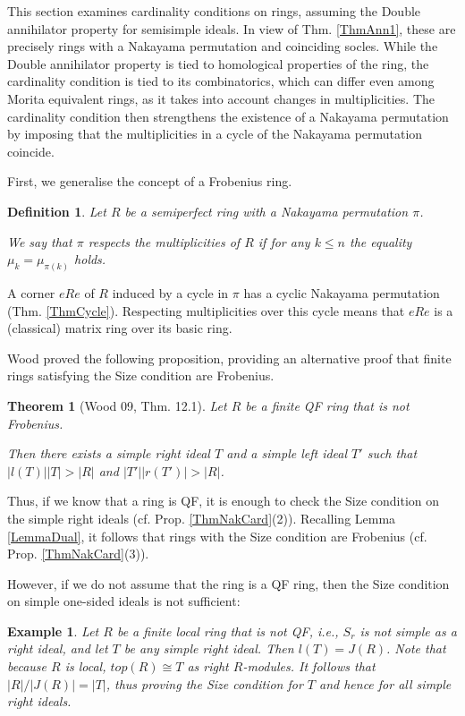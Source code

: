 \documentclass[11pt]{article}
\theoremstyle{plain}
\newtheorem{Thm}[veta]{Theorem}
\newtheorem{Ex}[veta]{Example}
\newtheorem{Def}[veta]{Definition}
\theoremstyle{remark}
\theoremstyle{plain}
\begin{document}
This section examines cardinality conditions on rings, assuming the Double annihilator property for semisimple ideals. In view of Thm. \ref{ThmAnn1}, these are precisely rings with a Nakayama permutation and coinciding socles.  While the Double annihilator property is tied to homological properties of the ring, the cardinality condition is tied to its combinatorics, which can differ even among Morita equivalent rings, as it takes into account changes in multiplicities. The cardinality condition then strengthens the existence of a Nakayama permutation by imposing that the multiplicities in a cycle of the Nakayama permutation coincide.  

\smallskip

First, we generalise the concept of a Frobenius ring. 

\begin{Def}\label{DefMult}
    Let $R$ be a semiperfect ring with a Nakayama permutation $\pi$.
    
    We say that $\pi$ \emph{respects the multiplicities of $R$} if for any $k\leq n$ the equality $\mu_k=\mu_{\pi(k)}$ holds.
\end{Def}
 A corner $eRe$ of $R$ induced by a cycle in $\pi$ has a cyclic Nakayama permutation (Thm. \ref{ThmCycle}). Respecting multiplicities over this cycle means that $eRe$ is a (classical) matrix ring over its basic ring.

\smallskip 

 Wood proved the following proposition, providing an alternative proof that finite rings satisfying the Size condition are Frobenius.

\begin{Thm}[Wood 09, Thm. 12.1]\label{ThmWoodSimple}
Let $R$ be a finite QF ring that is not Frobenius. 

Then there exists a simple right ideal $T$ and a simple left ideal $T'$ such that $|l(T)||T|>|R|$ and $|T'||r(T')|>|R|$.   
\end{Thm}

Thus, if we know that a ring is QF, it is enough to check the Size condition on the simple right ideals (cf. Prop. \ref{ThmNakCard}(2)). Recalling Lemma \ref{LemmaDual}, it follows that rings with the Size condition are Frobenius (cf. Prop. \ref{ThmNakCard}(3)). 

However, if we do not assume that the ring is a QF ring, then the Size condition on simple one-sided ideals is not sufficient: 
\begin{Ex}
Let $R$ be a finite local ring that is not QF, i.e., $S_r$ is not simple as a right ideal, and let $T$ be any simple right ideal. Then $l(T)=J(R)$. Note that because $R$ is local, $top(R)\cong T$ as right $R$-modules. It follows that $|R|/|J(R)|=|T|$, thus proving the Size condition for $T$ and hence for all simple right ideals.     
\end{Ex}
\end{document}
